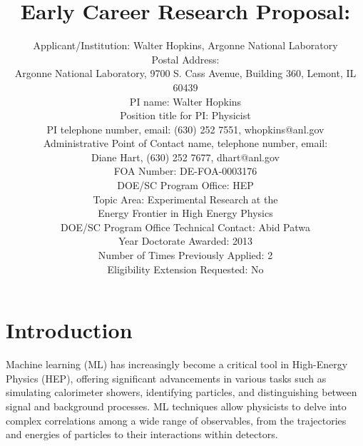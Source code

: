 \documentclass[letter, USenglish, 11pt, subfigure]{article}
\title{Early Career Research Proposal: \\}
\author{Applicant/Institution: Walter Hopkins, Argonne National Laboratory\\ Postal Address: \\Argonne National Laboratory, 9700 S. Cass Avenue, Building 360, Lemont, IL 60439
  \\PI name: Walter Hopkins\\Position title for PI: Physicist\\PI telephone number, email: (630) 252 7551, whopkins@anl.gov\\Administrative Point of Contact name, telephone number, email:\\Diane Hart, (630) 252 7677, dhart@anl.gov\\FOA Number: DE-FOA-0003176\\DOE/SC Program Office: HEP\\ Topic Area: Experimental Research at the \\Energy Frontier in High Energy Physics\\DOE/SC Program Office Technical Contact: Abid Patwa\\Year Doctorate Awarded: 2013\\Number of Times Previously Applied: 2\\Eligibility Extension Requested: No
}
\date{}
\begin{document}
% 

\clearpage
\tableofcontents
\thispagestyle{empty}

\clearpage
{} 





\section{Introduction}

Machine learning (ML) has increasingly become a critical tool in High-Energy Physics (HEP), offering significant advancements in various tasks such as simulating calorimeter showers, identifying particles, and distinguishing between signal and background processes. ML techniques allow physicists to delve into complex correlations among a wide range of observables, from the trajectories and energies of particles to their interactions within detectors. 
\end{document}
